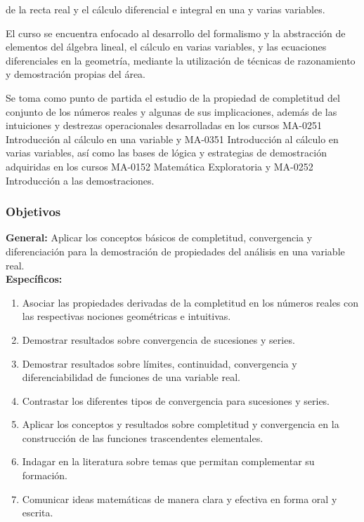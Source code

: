 \begin{refsection}
de la recta real y el cálculo diferencial e integral en una y varias variables. 

El curso se encuentra enfocado al desarrollo del formalismo y la abstracción de elementos del \'algebra lineal,  el c\'alculo en varias variables, y las ecuaciones diferenciales en la geometr\'{i}a, mediante la utilización de técnicas de razonamiento y demostración propias del área.

Se toma como punto de partida el estudio de la propiedad de completitud del conjunto de los números reales y algunas de sus implicaciones, además de las intuiciones y destrezas operacionales desarrolladas en los cursos MA-0251 Introducción al cálculo en una variable y MA-0351 Introducción al cálculo en varias variables, así como las bases de lógica y estrategias de demostración adquiridas en los cursos MA-0152 Matemática Exploratoria y MA-0252 Introducción a las demostraciones.





\subsubsection*{Objetivos}

\textbf{General:} Aplicar los conceptos básicos de completitud, convergencia y diferenciación para la demostración de propiedades del análisis en una variable real. \\

\textbf{Específicos:}

\begin{enumerate}
\item Asociar las propiedades derivadas de la completitud en los números reales con las respectivas nociones geométricas e intuitivas.
\item Demostrar resultados sobre convergencia de sucesiones y series.
\item Demostrar resultados sobre límites, continuidad, convergencia y diferenciabilidad de funciones de una variable real.
\item Contrastar los diferentes tipos de convergencia para sucesiones y series.
\item Aplicar los conceptos y resultados sobre completitud y convergencia en la construcción de las funciones trascendentes elementales.
\item Indagar en la literatura sobre temas que permitan complementar su formación.
\item Comunicar ideas matemáticas de manera clara y efectiva en forma oral y escrita.
\end{enumerate}


\end{refsection}
